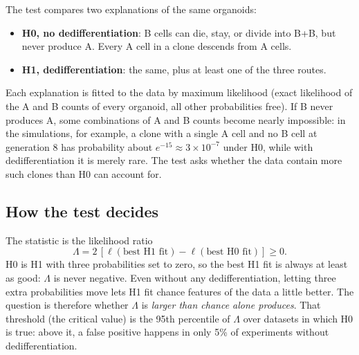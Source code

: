 \documentclass[10pt,a4paper]{article}
\begin{document}
The test compares two explanations of the same organoids:
\begin{itemize}
\item \textbf{H0, no dedifferentiation}: B cells can die, stay, or divide into B+B, but never produce A. Every A cell in a clone descends from A cells.
\item \textbf{H1, dedifferentiation}: the same, plus at least one of the three routes.
\end{itemize}
Each explanation is fitted to the data by maximum likelihood (exact likelihood of the A and B counts of every organoid, all other probabilities free). If B never produces A, some combinations of A and B counts become nearly impossible: in the simulations, for example, a clone with a single A cell and no B cell at generation 8 has probability about $e^{-15} \approx 3\times10^{-7}$ under H0, while with dedifferentiation it is merely rare. The test asks whether the data contain more such clones than H0 can account for.

\subsection{How the test decides}
The statistic is the likelihood ratio
\[ \Lambda = 2\,[\ell(\text{best H1 fit}) - \ell(\text{best H0 fit})] \ge 0 . \]
H0 is H1 with three probabilities set to zero, so the best H1 fit is always at least as good: $\Lambda$ is never negative. Even without any dedifferentiation, letting three extra probabilities move lets H1 fit chance features of the data a little better. The question is therefore whether $\Lambda$ is \emph{larger than chance alone produces}. That threshold (the critical value) is the 95th percentile of $\Lambda$ over datasets in which H0 is true: above it, a false positive happens in only 5\% of experiments without dedifferentiation.
\end{document}
